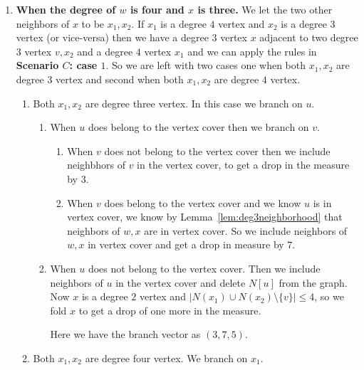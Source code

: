 \documentclass[svgnames]{llncs}
\begin{document}
{\begin{enumerate}[resume=scenarioC,label=\bfseries Case~\arabic*:]
\item {\bf When the degree of $w$ is four and $x$ is three.}
We let the two other neighbors of $x$ to be $x_1,x_2$. If $x_1$ is a degree $4$ vertex and $x_2$ is a degree $3$ vertex (or vice-versa) then we have a degree $3$ vertex $x$ adjacent 
to two degree $3$ vertex $v,x_2$ and a degree $4$ vertex
$x_1$ and we can apply the rules in {\bf Scenario $C$: case $1$}. So we are left with two cases one when both $x_1,x_2$ are degree $3$ vertex and second when both $x_1,x_2$ are degree $4$ vertex.
\begin{enumerate}
 \item Both $x_1,x_2$ are degree three vertex. In this case we branch on $u$.
 \begin{enumerate}
  \item When $u$ does belong to the vertex cover then we branch on $v$.
  \begin{enumerate}
   \item When $v$ does not belong to the vertex cover then we include neighbhors of $v$ in the vertex cover, to get a drop in the measure by $3$.
   \item When $v$ does belong to the vertex cover and we know $u$ is in vertex cover, we know by Lemma~\ref{lem:deg3neighborhood} that neighbors of $w,x$ are in vertex cover. So we include neighbors of $w,x$ in vertex cover and get
   a drop in measure by $7$.
  \end{enumerate}
  \item When $u$ does not belong to the vertex cover. Then we include neighbors of $u$ in the vertex cover and delete $N[u]$ from the graph. Now $x$ is a degree $2$ vertex and $\lvert N(x_1)\cup N(x_2) \setminus \{v\} \rvert \leq 4$,
  so we fold $x$ to get a drop of one more in the measure.
  

  Here we have the branch vector as $(3,7,5)$.
 \end{enumerate}
\item Both $x_1,x_2$ are degree four vertex. We branch on $x_1$.


\end{enumerate}
\end{enumerate}}
\end{document}
